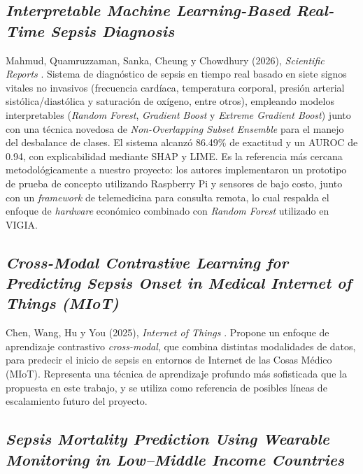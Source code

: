 \documentclass[11pt,a4paper]{article}
\begin{document}
\subsection{\textit{Interpretable Machine Learning-Based Real-Time Sepsis Diagnosis}}

Mahmud, Quamruzzaman, Sanka, Cheung y Chowdhury (2026), \textit{Scientific Reports} \cite{ref19}. Sistema de diagnóstico de sepsis en tiempo real basado en siete signos vitales no invasivos (frecuencia cardíaca, temperatura corporal, presión arterial sistólica/diastólica y saturación de oxígeno, entre otros), empleando modelos interpretables (\textit{Random Forest}, \textit{Gradient Boost} y \textit{Extreme Gradient Boost}) junto con una técnica novedosa de \textit{Non-Overlapping Subset Ensemble} para el manejo del desbalance de clases. El sistema alcanzó 86.49\% de exactitud y un AUROC de 0.94, con explicabilidad mediante SHAP y LIME. Es la referencia más cercana metodológicamente a nuestro proyecto: los autores implementaron un prototipo de prueba de concepto utilizando Raspberry Pi y sensores de bajo costo, junto con un \textit{framework} de telemedicina para consulta remota, lo cual respalda el enfoque de \textit{hardware} económico combinado con \textit{Random Forest} utilizado en VIGIA.

\subsection{\textit{Cross-Modal Contrastive Learning for Predicting Sepsis Onset in Medical Internet of Things (MIoT)}}

Chen, Wang, Hu y You (2025), \textit{Internet of Things} \cite{ref20}. Propone un enfoque de aprendizaje contrastivo \textit{cross-modal}, que combina distintas modalidades de datos, para predecir el inicio de sepsis en entornos de Internet de las Cosas Médico (MIoT). Representa una técnica de aprendizaje profundo más sofisticada que la propuesta en este trabajo, y se utiliza como referencia de posibles líneas de escalamiento futuro del proyecto.

\subsection{\textit{Sepsis Mortality Prediction Using Wearable Monitoring in Low--Middle Income Countries}}
\end{document}
